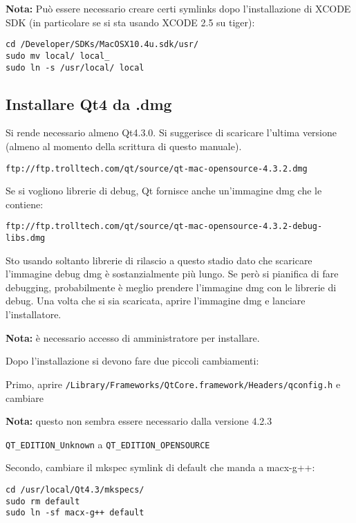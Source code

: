 \textbf{Nota:} Può essere necessario creare certi symlinks dopo l'installazione di XCODE SDK (in particolare se si sta usando XCODE 2.5 su tiger):

\begin{verbatim}
cd /Developer/SDKs/MacOSX10.4u.sdk/usr/
sudo mv local/ local_
sudo ln -s /usr/local/ local
\end{verbatim}

\subsection{Installare Qt4 da .dmg}
Si rende necessario almeno Qt4.3.0. Si suggerisce di scaricare l'ultima versione (almeno al momento della scrittura di questo manuale).

\begin{verbatim}
ftp://ftp.trolltech.com/qt/source/qt-mac-opensource-4.3.2.dmg
\end{verbatim}

Se si vogliono librerie di debug, Qt fornisce anche un'immagine dmg che le contiene:

\begin{verbatim}
ftp://ftp.trolltech.com/qt/source/qt-mac-opensource-4.3.2-debug-libs.dmg
\end{verbatim}

Sto usando soltanto librerie di rilascio a questo stadio dato che scaricare l'immagine debug dmg è sostanzialmente più lungo. Se però si pianifica di fare debugging, probabilmente è meglio prendere l'immagine dmg con le librerie di debug. Una volta che si sia scaricata, aprire l'immagine dmg e lanciare l'installatore.

\textbf{Nota:} è necessario accesso di amministratore per installare.

Dopo l'installazione si devono fare due piccoli cambiamenti:

Primo, aprire \texttt{/Library/Frameworks/QtCore.framework/Headers/qconfig.h} e cambiare

\textbf{Nota:} questo non sembra essere necessario dalla versione 4.2.3

\texttt{QT\_EDITION\_Unknown} a \texttt{QT\_EDITION\_OPENSOURCE}

Secondo, cambiare il mkspec symlink di default che manda a macx-g++:

\begin{verbatim}
cd /usr/local/Qt4.3/mkspecs/ 
sudo rm default 
sudo ln -sf macx-g++ default
\end{verbatim}

